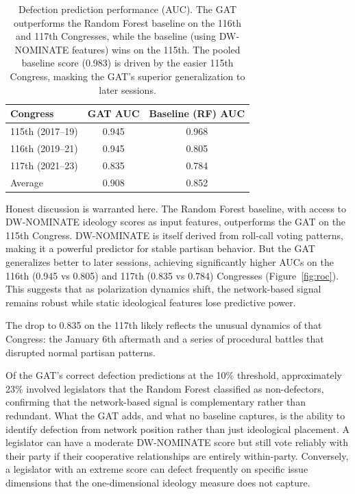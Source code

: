 \documentclass[12pt, a4paper]{article}
\begin{document}
\begin{table}[!htbp]
\centering
\caption{Defection prediction performance (AUC). The GAT outperforms the Random Forest baseline on the 116th and 117th Congresses, while the baseline (using DW-NOMINATE features) wins on the 115th. The pooled baseline score (0.983) is driven by the easier 115th Congress, masking the GAT's superior generalization to later sessions.}
\label{tab:defection}
\begin{tabular}{lcc}
\toprule
Congress & GAT AUC & Baseline (RF) AUC \\
\midrule
115th (2017--19) & 0.945 & 0.968 \\
116th (2019--21) & 0.945 & 0.805 \\
117th (2021--23) & 0.835 & 0.784 \\
\midrule
Average & 0.908 & 0.852 \\
\bottomrule
\end{tabular}
\end{table}

Honest discussion is warranted here. The Random Forest baseline, with access to DW-NOMINATE ideology scores as input features, outperforms the GAT on the 115th Congress. DW-NOMINATE is itself derived from roll-call voting patterns, making it a powerful predictor for stable partisan behavior. But the GAT generalizes better to later sessions, achieving significantly higher AUCs on the 116th (0.945 vs 0.805) and 117th (0.835 vs 0.784) Congresses (Figure~\ref{fig:roc}). This suggests that as polarization dynamics shift, the network-based signal remains robust while static ideological features lose predictive power.

The drop to 0.835 on the 117th likely reflects the unusual dynamics of that Congress: the January 6th aftermath and a series of procedural battles that disrupted normal partisan patterns.

Of the GAT's correct defection predictions at the 10\% threshold, approximately 23\% involved legislators that the Random Forest classified as non-defectors, confirming that the network-based signal is complementary rather than redundant. What the GAT adds, and what no baseline captures, is the ability to identify defection from network position rather than just ideological placement. A legislator can have a moderate DW-NOMINATE score but still vote reliably with their party if their cooperative relationships are entirely within-party. Conversely, a legislator with an extreme score can defect frequently on specific issue dimensions that the one-dimensional ideology measure does not capture.
\end{document}
